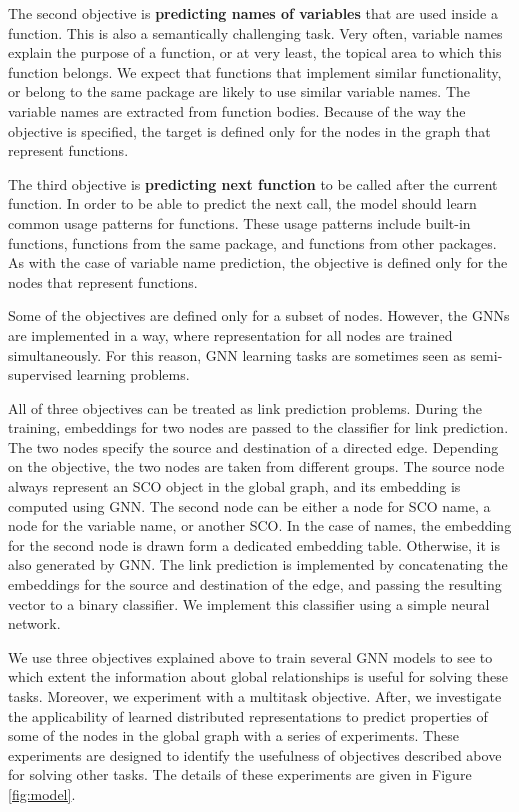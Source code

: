 \documentclass[a4paper,twoside]{article}
\begin{document}
The second objective is \textbf{predicting names of variables} that are used inside a function. This is also a semantically challenging task. Very often, variable names explain the purpose of a function, or at very least, the topical area to which this function belongs. We expect that functions that implement similar functionality, or belong to the same package are likely to use similar variable names. The variable names are extracted from function bodies. Because of the way the objective is specified, the target is defined only for the nodes in the graph that represent functions.  

The third objective is \textbf{predicting next function} to be called after the current function. In order to be able to predict the next call, the model should learn common usage patterns for functions. These usage patterns include built-in functions, functions from the same package, and functions from other packages. As with the case of variable name prediction, the objective is defined only for the nodes that represent functions. 

Some of the objectives are defined only for a subset of nodes. However, the GNNs are implemented in a way, where representation for all nodes are trained simultaneously. For this reason, GNN learning tasks are sometimes seen as semi-supervised learning problems.

All of three objectives can be treated as link prediction problems. During the training, embeddings for two nodes are passed to the classifier for link prediction. The two nodes specify the source and destination of a directed edge. Depending on the objective, the two nodes are taken from different groups. The source node always represent an SCO object in the global graph, and its embedding is computed using GNN\@. The second node can be either a node for SCO name, a node for the variable name, or another SCO\@. In the case of names, the embedding for the second node is drawn form a dedicated embedding table. Otherwise, it is also generated by GNN\@. The link prediction is implemented by concatenating the embeddings for the source and destination of the edge, and passing the resulting vector to a binary classifier. We implement this classifier using a simple neural network.

We use three objectives explained above to train several GNN models to see to which extent the information about global relationships is useful for solving these tasks. Moreover, we experiment with a multitask objective. After, we investigate the applicability of learned distributed representations to predict properties of some of the nodes in the global graph with a series of experiments. These experiments are designed to identify the usefulness of objectives described above for solving other tasks. The details of these experiments are given in Figure \ref{fig:model}.
\end{document}
